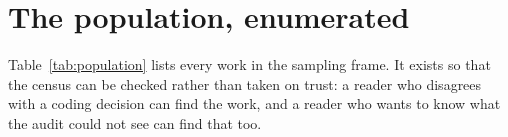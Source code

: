 \documentclass[preprint,11pt,3p]{elsarticle}
\begin{document}
\appendix
\section{The population, enumerated}

Table~\ref{tab:population} lists every work in the sampling frame. It exists so that the census
can be checked rather than taken on trust: a reader who disagrees with a coding decision can find
the work, and a reader who wants to know what the audit could not see can find that too.

{\small}



\end{document}
